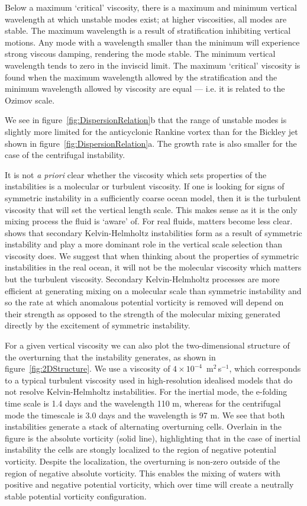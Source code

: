 Below a maximum `critical' viscosity, there is a maximum and minimum vertical wavelength at which unstable modes exist; at higher viscosities, all modes are stable. The maximum wavelength is a result of stratification inhibiting vertical motions. Any mode with a wavelength smaller than the minimum will experience strong viscous damping, rendering the mode stable. The minimum vertical wavelength tends to zero in the inviscid limit. The maximum `critical' viscosity is found when the maximum wavelength allowed by the stratification and the minimum wavelength allowed by viscosity are equal --- i.e. it is related to the Ozimov scale.

We see in figure~\ref{fig:DispersionRelation}b that the range of unstable modes is slightly more limited for the anticyclonic Rankine vortex than for the Bickley jet shown in figure~\ref{fig:DispersionRelation}a. The growth rate is also smaller for the case of the centrifugal instability.

It is not \textit{a priori} clear whether the viscosity which sets properties of the instabilities is a molecular or turbulent viscosity. If one is looking for signs of symmetric instability in a sufficiently coarse ocean model, then it is the turbulent viscosity that will set the vertical length scale. This makes sense as it is the only mixing process the fluid is `aware' of. For real fluids, matters become less clear. \citet{Griffiths2003a} shows that secondary Kelvin-Helmholtz instabilities form as a result of symmetric instability and play a more dominant role in the vertical scale selection than viscosity does. We suggest that when thinking about the properties of symmetric instabilities in the real ocean, it will not be the molecular viscosity which matters but the turbulent viscosity. Secondary Kelvin-Helmholtz processes are more efficient at generating mixing on a molecular scale than symmetric instability and so the rate at which anomalous potential vorticity is removed will depend on their strength as opposed to the strength of the molecular mixing generated directly by the excitement of symmetric instability.

For a given vertical viscosity we can also plot the two-dimensional structure of the overturning that the instability generates, as shown in figure~\ref{fig:2DStructure}. We use a viscosity of $4 \times 10 ^{-4}$~m$^2$\,s$^{-1}$, which corresponds to a typical turbulent viscosity used in high-resolution idealised models that do not resolve Kelvin-Helmholtz instabilities. For the inertial mode, the e-folding time scale is 1.4 days and the wavelength 110 m, whereas for the centrifugal mode the timescale is 3.0 days and the wavelength is 97 m. We see that both instabilities generate a stack of alternating overturning cells. Overlain in the figure is the absolute vorticity (solid line), highlighting that in the case of inertial instability the cells are stongly localized to the region of negative potential vorticity. Despite the localization, the overturning is non-zero outside of the region of negative absolute vorticity. This enables the mixing of waters with positive and negative potential vorticity, which over time will create a neutrally stable potential vorticity configuration.

